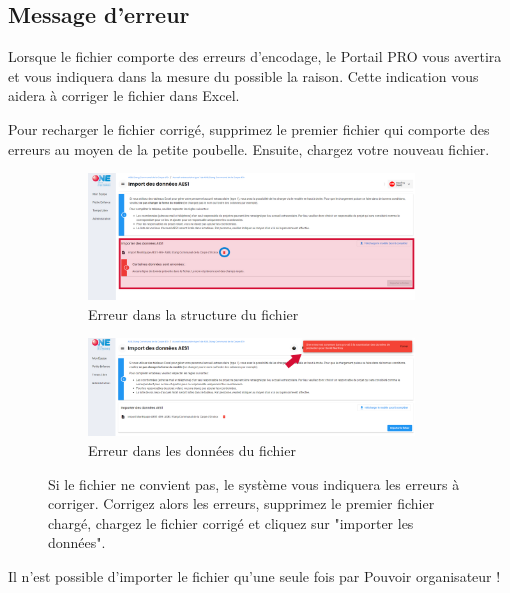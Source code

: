 \subsection{Message d'erreur}
Lorsque le fichier comporte des erreurs d'encodage, le Portail PRO vous avertira et vous indiquera dans la mesure du possible la raison. Cette indication vous aidera à corriger le fichier dans Excel.

Pour recharger le fichier corrigé, supprimez le premier fichier qui comporte des erreurs au moyen de la petite poubelle. Ensuite, chargez votre nouveau fichier.

\begin{figure}[!h]
    \centering
    \begin{subfigure}[t]{0.48\textwidth}
         \centering
         \includegraphics[width=0.95\textwidth]{Images/aes/upload_aes1/import_aes1_error.png}
         \caption{Erreur dans la structure du fichier}
         \label{subfig:modèle_erreur_structure}
     \end{subfigure}
    \begin{subfigure}[t]{0.48\textwidth}
         \centering
         \includegraphics[width=0.95\textwidth]{Images/aes/upload_aes1/import_aes1_error_import.png}
         \caption{Erreur dans les données du fichier}
         \label{subfig:modèle_erreur_data}
     \end{subfigure}

    
    \caption{Si le fichier ne convient pas, le système vous indiquera les erreurs à corriger. Corrigez alors les erreurs, supprimez le premier fichier chargé, chargez le fichier corrigé et cliquez sur "importer les données".}
    \label{fig:aes1_modèle_erreur}
    
\end{figure}


\begin{attention}
Il n'est possible d'importer le fichier qu'une seule fois par Pouvoir organisateur ! 
\end{attention}